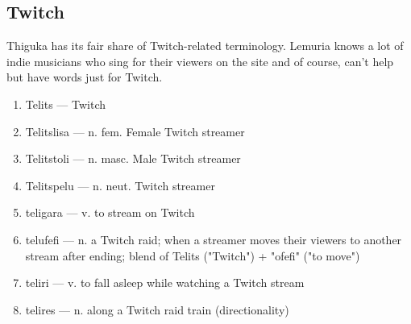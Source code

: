 \subsection{Twitch}
Thiguka has its fair share of Twitch-related terminology.
Lemuria knows a lot of indie musicians who sing for their viewers on the site and of course, can't help but have words just for Twitch.

\begin{multicols}{2} 
    \begin{enumerate}
        \item Telits --- Twitch
        \item Telitslisa --- n. fem. Female Twitch streamer
        \item Telitstoli --- n. masc. Male Twitch streamer
        \item Telitspelu --- n. neut. Twitch streamer
        \item teligara --- v. to stream on Twitch
        \item telufefi --- n. a Twitch raid; when a streamer moves their viewers to another stream after ending; blend of Telits ("Twitch") + "ofefi" ("to move")
        \item teliri --- v. to fall asleep while watching a Twitch stream
        \item telires --- n. along a Twitch raid train (directionality)
    \end{enumerate}
\end{multicols}
